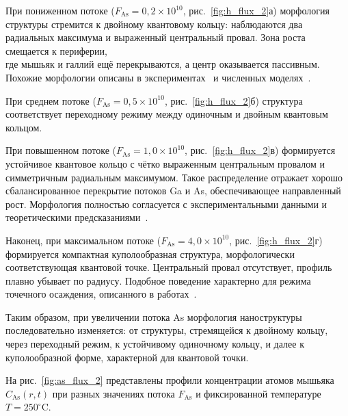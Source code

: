 \documentclass[14pt,oneside]{extarticle}
\begin{document}
При пониженном потоке ($F_{\text{As}} = 0{,}2 \times 10^{10}$, рис.~\ref{fig:h_flux_2}а) морфология структуры стремится к двойному квантовому кольцу: наблюдаются два радиальных максимума и выраженный центральный провал. Зона роста смещается к периферии,\\ 
где мышьяк и галлий ещё перекрываются, а центр оказывается пассивным.\\ 
Похожие морфологии описаны в экспериментах~\cite{mano2005nano} и численных моделях~\cite{zhou2013}.

При среднем потоке ($F_{\text{As}} = 0{,}5 \times 10^{10}$, рис.~\ref{fig:h_flux_2}б) структура соответствует переходному режиму между одиночным и двойным квантовым кольцом.

При повышенном потоке ($F_{\text{As}} = 1{,}0 \times 10^{10}$, рис.~\ref{fig:h_flux_2}в) формируется устойчивое квантовое кольцо с чётко выраженным центральным провалом и симметричным радиальным максимумом. Такое распределение отражает хорошо сбалансированное перекрытие потоков Ga и As, обеспечивающее направленный рост. Морфология полностью согласуется с экспериментальными данными и теоретическими предсказаниями~\cite{fan2023, mano2005nano}.

Наконец, при максимальном потоке ($F_{\text{As}} = 4{,}0 \times 10^{10}$, рис.~\ref{fig:h_flux_2}г) формируется компактная куполообразная структура, морфологически соответствующая квантовой точке. Центральный провал отсутствует, профиль плавно убывает по радиусу. Подобное поведение характерно для режима точечного осаждения, описанного в работах~\cite{fan2023evaporation, wang2022quantum}.

Таким образом, при увеличении потока As морфология наноструктуры последовательно изменяется: от структуры, стремящейся к двойному кольцу, через переходный режим, к устойчивому одиночному кольцу, и далее к куполообразной форме, характерной для квантовой точки.

На рис.~\ref{fig:as_flux_2} представлены профили концентрации атомов мышьяка $C_{\text{As}}(r, t)$ при разных значениях потока $F_{\text{As}}$ и фиксированной температуре $T = 250^\circ$C. 
\end{document}
